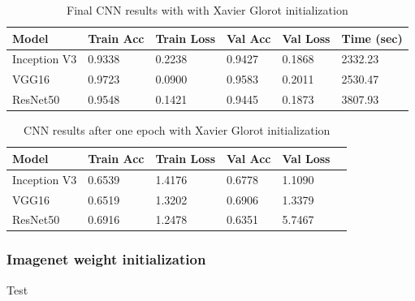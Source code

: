 \documentclass{article}
\theoremstyle{definition}
\theoremstyle{remark}
\begin{document}
\begin{table}[h!]
\center
\begin{tabular}{|l|l|l|l|l|l|}
\hline
\textbf{Model} & \textbf{Train Acc} & \textbf{Train Loss} & \textbf{Val Acc} & \textbf{Val Loss} & \textbf{Time (sec)}\\ \hline
Inception V3	& 0.9338 & 0.2238  & 0.9427	& 0.1868 &	2332.23\\ \hline
VGG16  		& 0.9723   & 0.0900   & 0.9583	&	0.2011 &  2530.47\\ \hline
ResNet50  	& 0.9548  & 0.1421 	& 0.9445 &	0.1873	 &  3807.93\\ \hline
\end{tabular}
\caption{Final CNN results with with Xavier Glorot initialization}
\label{tab:final_cnn_results_xavier}
\end{table}

\begin{table}[h!]
\center
\begin{tabular}{|l|l|l|l|l|l|}
\hline
\textbf{Model} & \textbf{Train Acc} & \textbf{Train Loss} & \textbf{Val Acc} & \textbf{Val Loss}\\ \hline
Inception V3 & 0.6539 	& 1.4176 	 &  0.6778	 & 1.1090\\ \hline
VGG16  		& 0.6519   	& 1.3202     &  0.6906	 &	1.3379\\ \hline
ResNet50  	& 0.6916  	& 1.2478 	 &  0.6351	 &	5.7467\\ \hline
\end{tabular}
\caption{CNN results after one epoch with Xavier Glorot initialization}
\label{tab:one_epoch_cnn_results_xavier}
\end{table}


\subsubsection{Imagenet weight initialization}

Test
\end{document}

